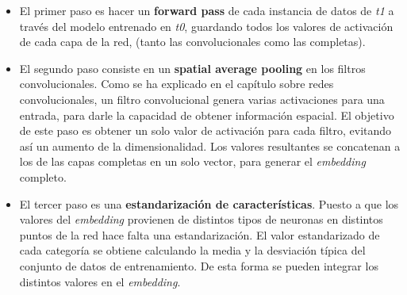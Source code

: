 \documentclass[12,twoside]{TFG-GM}
\theoremstyle{definition}
\theoremstyle{remark}
\begin{document}
\begin{itemize}
\item El primer paso es hacer un \textbf{forward pass} de cada instancia de datos de \textit{t1} a través del modelo entrenado en \textit{t0}, guardando todos los valores de activación de cada capa de la red, (tanto las convolucionales como las completas). 

\item El segundo paso consiste en un \textbf{spatial average pooling} en los filtros convolucionales. Como se ha explicado en el capítulo sobre redes convolucionales, un filtro convolucional genera varias activaciones para una entrada, para darle la capacidad de obtener información espacial.  El objetivo de este paso es obtener un solo valor de activación para cada filtro, evitando así un aumento de la dimensionalidad. Los valores resultantes se concatenan a los de las capas completas en un solo vector, para generar el \textit{embedding} completo.

\item El tercer paso es una \textbf{estandarización de características}. Puesto a que los valores del \textit{embedding} provienen de distintos tipos de neuronas en distintos puntos de la red hace falta una estandarización. El valor estandarizado de cada categoría se obtiene calculando la media y la desviación típica del conjunto de datos de entrenamiento. De esta forma se pueden integrar los distintos valores en el \textit{embedding}. 

\begin{figure}
\label{fig:caracterization}
\centering
{}

\end{figure}


\end{itemize}
\end{document}
